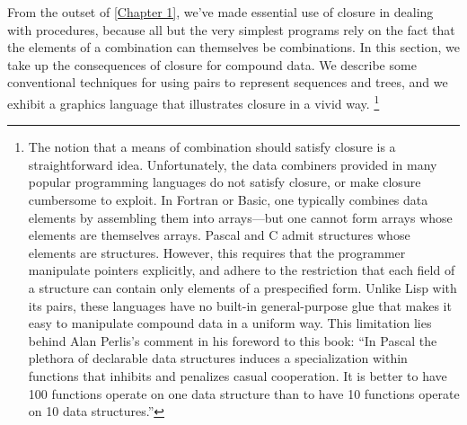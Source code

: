 From the outset of \cref{Chapter 1}, we’ve made essential use of closure in dealing with procedures, because all but the very simplest programs rely on the fact that the elements of a combination can themselves be combinations.
In this section, we take up the consequences of closure for compound data.
We describe some conventional techniques for using pairs to represent sequences and trees, and we exhibit a graphics language that illustrates closure in a vivid way.%
\footnote{
	The notion that a means of combination should satisfy closure is a straightforward idea.
	Unfortunately, the data combiners provided in many popular programming languages do not satisfy closure, or make closure cumbersome to exploit.
	In Fortran or Basic, one typically combines data elements by assembling them into arrays---but one cannot form arrays whose elements are themselves arrays.
	Pascal and C admit structures whose elements are structures.
	However, this requires that the programmer manipulate pointers explicitly, and adhere to the restriction that each field of a structure can contain only elements of a prespecified form.
	Unlike Lisp with its pairs, these languages have no built-in general-purpose glue that makes it easy to manipulate compound data in a uniform way.
	This limitation lies behind Alan Perlis’s comment in his foreword to this book:
	“In Pascal the plethora of declarable data structures induces a specialization within functions that inhibits and penalizes casual cooperation.
	It is better to have 100 functions operate on one data structure than to have 10 functions operate on 10 data structures.”
}





